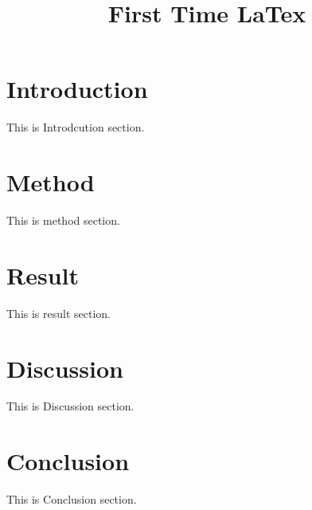 \documentclass{article}
\title{First Time LaTex}
\begin{document}
\tableofcontents

\section{Introduction}

This is Introdcution section.

\section{Method}

This is method section.

\section{Result}

This is result section.


\section*{Discussion}

This is Discussion section.

\section{Conclusion}

This is Conclusion section.
\end{document}
